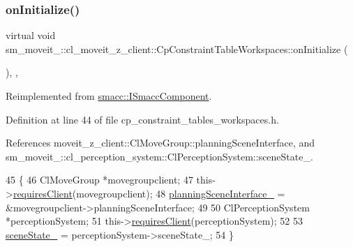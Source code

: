 \subsubsection{\texorpdfstring{on\+Initialize()}{onInitialize()}}
{\footnotesize\ttfamily virtual void sm\+\_\+moveit\+\_\+::cl\+\_\+moveit\+\_\+z\+\_\+client\+::\+Cp\+Constraint\+Table\+Workspaces\+::on\+Initialize (\begin{DoxyParamCaption}{ }\end{DoxyParamCaption})\hspace{0.3cm}{\ttfamily [inline]}, {\ttfamily [override]}, {\ttfamily [virtual]}}



Reimplemented from \hyperlink{classsmacc_1_1ISmaccComponent_ae6f71d008db12553912e9436184b9e65}{smacc\+::\+I\+Smacc\+Component}.



Definition at line 44 of file cp\+\_\+constraint\+\_\+tables\+\_\+workspaces.\+h.



References moveit\+\_\+z\+\_\+client\+::\+Cl\+Move\+Group\+::planning\+Scene\+Interface, and sm\+\_\+moveit\+\_\+::cl\+\_\+perception\+\_\+system\+::\+Cl\+Perception\+System\+::scene\+State\+\_\+.


\begin{DoxyCode}
45             \{
46                 ClMoveGroup *movegroupclient;
47                 this->\hyperlink{classsmacc_1_1ISmaccComponent_a36c085d906fbae0fcaee817aaeafebf4}{requiresClient}(movegroupclient);
48                 \hyperlink{classsm__moveit__4_1_1cl__moveit__z__client_1_1CpConstraintTableWorkspaces_a24d96bcde58af9e8aacbb4737859ac95}{planningSceneInterface\_} = &movegroupclient->planningSceneInterface;
49 
50                 ClPerceptionSystem *perceptionSystem;
51                 this->\hyperlink{classsmacc_1_1ISmaccComponent_a36c085d906fbae0fcaee817aaeafebf4}{requiresClient}(perceptionSystem);
52 
53                 \hyperlink{classsm__moveit__4_1_1cl__moveit__z__client_1_1CpConstraintTableWorkspaces_ae2d0e4852e944e8a870d5936de646d47}{sceneState\_} = perceptionSystem->sceneState\_;
54             \}
\end{DoxyCode}
\mbox{\label{classsm__moveit__4_1_1cl__moveit__z__client_1_1CpConstraintTableWorkspaces_ac27a48c21b8b476b426b0bf9d7000c8b}} 
